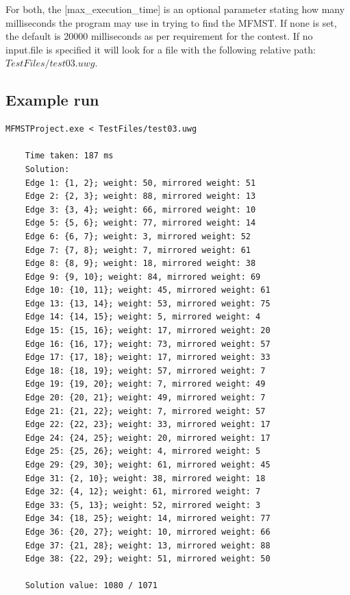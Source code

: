 \documentclass[12pt]{report}
\begin{document}
For both, the [max\_execution\_time] is an optional parameter stating how many milliseconds the program may use in trying to find the MFMST. If none is set, the default is 20000 milliseconds as per requirement for the contest. If no input.file is specified it will look for a file with the following relative path: $TestFiles/test03.uwg$.

\subsection{Example run}
\begin{lstlisting}[basicstyle=\footnotesize]
	MFMSTProject.exe < TestFiles/test03.uwg
	
	Time taken: 187 ms
	Solution:
	Edge 1: {1, 2}; weight: 50, mirrored weight: 51
	Edge 2: {2, 3}; weight: 88, mirrored weight: 13
	Edge 3: {3, 4}; weight: 66, mirrored weight: 10
	Edge 5: {5, 6}; weight: 77, mirrored weight: 14
	Edge 6: {6, 7}; weight: 3, mirrored weight: 52
	Edge 7: {7, 8}; weight: 7, mirrored weight: 61
	Edge 8: {8, 9}; weight: 18, mirrored weight: 38
	Edge 9: {9, 10}; weight: 84, mirrored weight: 69
	Edge 10: {10, 11}; weight: 45, mirrored weight: 61
	Edge 13: {13, 14}; weight: 53, mirrored weight: 75
	Edge 14: {14, 15}; weight: 5, mirrored weight: 4
	Edge 15: {15, 16}; weight: 17, mirrored weight: 20
	Edge 16: {16, 17}; weight: 73, mirrored weight: 57
	Edge 17: {17, 18}; weight: 17, mirrored weight: 33
	Edge 18: {18, 19}; weight: 57, mirrored weight: 7
	Edge 19: {19, 20}; weight: 7, mirrored weight: 49
	Edge 20: {20, 21}; weight: 49, mirrored weight: 7
	Edge 21: {21, 22}; weight: 7, mirrored weight: 57
	Edge 22: {22, 23}; weight: 33, mirrored weight: 17
	Edge 24: {24, 25}; weight: 20, mirrored weight: 17
	Edge 25: {25, 26}; weight: 4, mirrored weight: 5
	Edge 29: {29, 30}; weight: 61, mirrored weight: 45
	Edge 31: {2, 10}; weight: 38, mirrored weight: 18
	Edge 32: {4, 12}; weight: 61, mirrored weight: 7
	Edge 33: {5, 13}; weight: 52, mirrored weight: 3
	Edge 34: {18, 25}; weight: 14, mirrored weight: 77
	Edge 36: {20, 27}; weight: 10, mirrored weight: 66
	Edge 37: {21, 28}; weight: 13, mirrored weight: 88
	Edge 38: {22, 29}; weight: 51, mirrored weight: 50
	
	Solution value: 1080 / 1071
\end{lstlisting}
\end{document}
